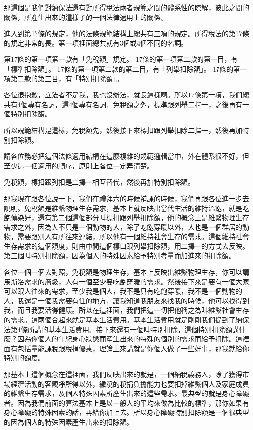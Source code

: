 \documentclass[]{ctexbook}
\begin{document}
那這個是我們對納保法還有對所得稅法兩者規範之間的體系性的瞭解，彼此之間的關係，所產生出來的這樣子的一個法律適用上的關係。

進入到第17條的規定，他的法條規範結構上總共有三項的規定。所得稅法的第17條的規定非常的長。第一項裡面總共就有3個或4個不同的名詞。

第17條的第一項第一款有「免稅額」規定。
17條的第一項第二款的第一目，有「標準扣除額」。
17條的第一項第二款的第二目，有「列舉扣除額」。
17條的第一項第二款的第三目，有「特別扣除額」。

各位很抱歉，立法者不是我，我也沒辦法，就長這樣啊。所以17條第一項，我們總共有4個專有名詞，這4個專有名詞，免稅額之外，標準跟列舉二擇一，之後再有一個特別扣除額。

所以規範結構是這樣，免稅額先，然後接下來標扣跟列舉扣除二擇一，然後再加特別扣除額。

請各位務必把這個法條適用結構在這麼複雜的規範邏輯當中，外在體系很不好，但至少這一個適用的順序，原則上各位一定弄清楚。

免稅額，標扣跟列扣是二擇一相互替代，然後再加特別扣除額。

那我現在跟各位說一下，我們在禮拜六的時候補課的時候，我們再跟各位進一步去說明。免稅額是維繫物理生存需求，基本上就反映出當代生活的維持溫飽，就是吃飽傳染好，還有第二個這個部分叫標扣跟列舉扣除額，他的概念上是維繫物理生存需求之外，因為人不只是一個動物的人，除了吃飽穿暖以外，人也是一個群居的動物，需要跟別人有所往來連結，所以他有一個維持社會生存的需求。這個維持社會生存需求的這個額度，則由中間這個標口跟列舉扣除額，用二擇一的方式去反映。第三個叫特別扣除額，因為個人的特殊因素給予特別考量而加進來的扣除額。

各位一個一個去對照，免稅額是物理生存，基本上反映出維繫物理生存，你可以講馬斯洛需求的層級，人有一個至少要吃飽穿暖的需求。然後接下來是要有一個大家可以跟人往來的需求，至少我是個人，我不是只有吃飽穿暖，我不是一個動物的人，我還是一個我需要有住的地方，讓我知道我朋友來找我的時候，他可以找得到我，而且我要活得健康。所以在這裡面，我們把這一切把他稱之為叫維繫社會生存的需求。這兩個合起來就是基本生活費用。基本生活費用就是剛剛我們提到了納保法第4條所講的基本生活費用。接下來還有一個叫特別扣除，這個特別扣除額講什麼？因為你個人的年紀身心狀態而產生出來的特殊的個別的需求而給予扣除。這裡面有包括量能課稅跟稅捐優惠，理論上來講就是你個人做了一些好事，那我就給你特別的額度。

那基本上這個概念在這裡面，我們反映出來的就是，一個納稅義務人，除了獲得市場經濟活動的客觀凈所得以外，繳稅的稅捐負擔能力也要扣掉維繫個人及家庭成員的維繫生存需求，及個人特殊因素所產生出來的這些需求。最典型的就是身心障礙者。因為我們前面的算法基本上是以一般人的平均來做為比較的標準，那你如果有身心障礙的特殊因素的話，再給你加上去。所以身心障礙特別扣除額是一個很典型的因為個人的特殊因素產生出來的扣除額。
\end{document}
